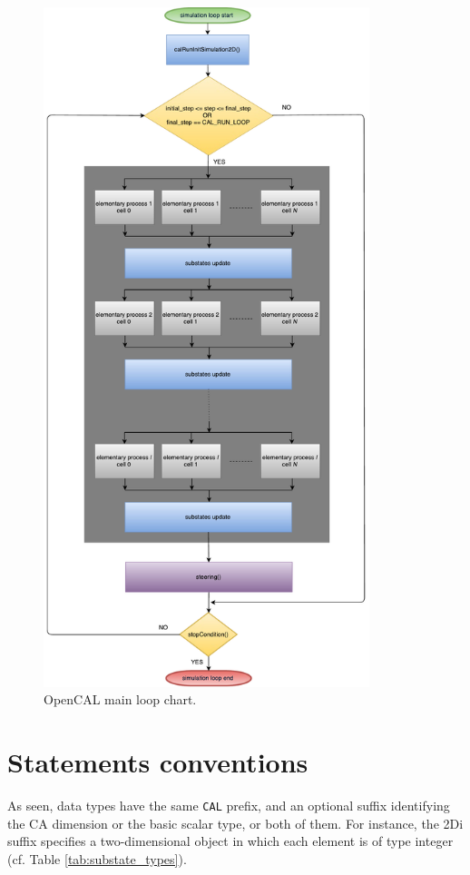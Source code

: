 \begin{figure}[htbp]
  \centering
  \includegraphics[width=9.5cm]{./images/OpenCAL/opencal_main_loop.pdf}
  \caption{OpenCAL main loop chart.}
  \label{fig:opencal_main_loop}
\end{figure}


\section{Statements conventions}\label{sec:Conventions}

As seen, data types have the same \verb'CAL' prefix, and an
optional suffix identifying the CA dimension or the basic scalar type,
or both of them. For instance, the 2Di suffix specifies a
two-dimensional object in which each element is of type integer
(cf. Table \ref{tab:substate_types}).

